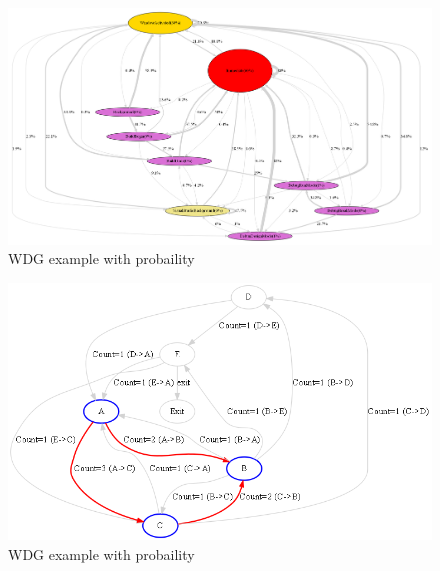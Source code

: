 \begin{enumerate}
\begin{figure}
  \centering
  \includegraphics[scale=.20]{../Graphics/log_with_color.png}
  \caption{WDG example with probaility}\label{fig:log_with_color}
\end{figure}

\begin{figure}
  \centering
  \includegraphics[scale=.58]{../Graphics/sample_log.png}
  \caption{WDG example with probaility}\label{fig:sample_log}
\end{figure}

                
	\end{enumerate}



